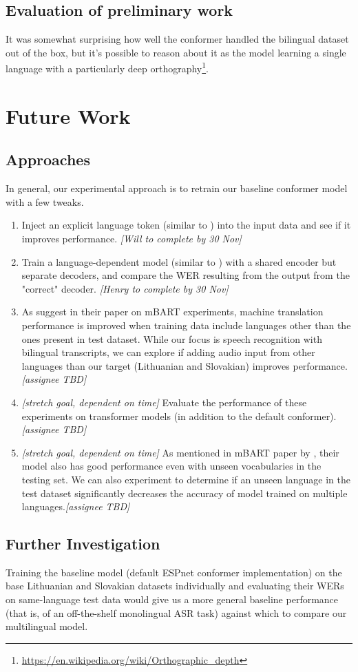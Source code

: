 \documentclass{article}
\begin{document}
  \subsection{Evaluation of preliminary work}
  It was somewhat surprising how well the conformer handled the bilingual dataset out of the box, but it's possible to reason about it as the model learning a single language with a particularly deep orthography\footnote{\url{https://en.wikipedia.org/wiki/Orthographic_depth}}.
  \section{Future Work}
  \subsection{Approaches}
  In general, our experimental approach is to retrain our baseline conformer model with a few tweaks.
  \begin{enumerate}
    \item Inject an explicit language token (similar to \cite{Liu}) into the input data and see if it improves performance. \textit{[Will to complete by 30 Nov]}
    \item Train a language-dependent model (similar to \cite{Yilmaz}) with a shared encoder but separate decoders, and compare the WER resulting from the output from the "correct" decoder. \textit{[Henry to complete by 30 Nov]}
    \item As \cite{Liu} suggest in their paper on mBART experiments, machine translation performance is improved when training data include languages other than the ones present in test dataset. While our focus is speech recognition with bilingual transcripts, we can explore if adding audio input from other languages than our target (Lithuanian and Slovakian) improves performance. \textit{[assignee TBD]}
    \item \textit{[stretch goal, dependent on time]} Evaluate the performance of these experiments on transformer models (in addition to the default conformer). \textit{[assignee TBD]}
    \item \textit{[stretch goal, dependent on time]} As mentioned in mBART paper by \cite{Liu}, their model also has good performance even with unseen vocabularies in the testing set. We can also experiment to determine if an unseen language in the test dataset significantly decreases the accuracy of model trained on multiple languages.\textit{[assignee TBD]}
  \end{enumerate}
  \subsection{Further Investigation}
  Training the baseline model (default ESPnet conformer implementation) on the base Lithuanian and Slovakian datasets individually and evaluating their WERs on same-language test data would give us a more general baseline performance (that is, of an off-the-shelf monolingual ASR task) against which to compare our multilingual model.
  \newpage
  
  
\end{document}
